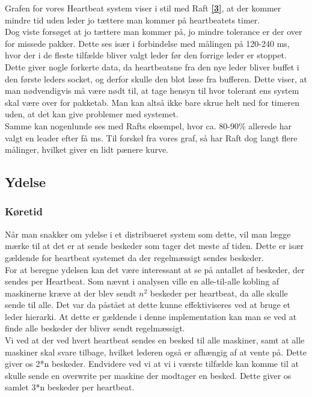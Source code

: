 \documentclass[a4paper,12pt]{article}
\begin{document}
Grafen for vores Heartbeat system viser i stil med Raft \hyperref[tre]{\textbf{[3]}}, at der kommer mindre tid uden leder jo tættere man kommer på heartbeatets timer.
\\
Dog viste forsøget at jo tættere man kommer på, jo mindre tolerance er der over for missede pakker. Dette ses især i forbindelse med målingen på 120-240 ms, hvor der i de fleste tilfælde bliver valgt leder før den forrige leder er stoppet. Dette giver nogle forkerte data, da heartbeatsne fra den nye leder bliver buffet i den første leders socket, og derfor skulle den blot læse fra bufferen. Dette viser, at man nødvendigvis må være nødt til, at tage hensyn til hvor tolerant ens system skal være over for pakketab. Man kan altså ikke bare skrue helt ned for timeren uden, at det kan give problemer med systemet. 
\\
Samme kan nogenlunde ses med Rafts eksempel, hvor ca. 80-90\% allerede har valgt en leader efter få ms. Til forskel fra vores graf, så har Raft dog langt flere målinger, hvilket giver en lidt pænere kurve.

\subsection{Ydelse}
\subsubsection{Køretid}
Når man snakker om ydelse i et distribueret system som dette, vil man lægge mærke til at det er at sende beskeder som tager det meste af tiden. Dette er især gældende for heartbeat systemet da der regelmæssigt sendes beskeder.
\\
For at beregne ydelsen kan det være interessant at se på antallet af beskeder, der sendes per Heartbeat.
Som nævnt i analysen ville en alle-til-alle kobling af maskinerne kræve at der blev sendt $n^2$ beskeder per heartbeat, da alle skulle sende til alle. 
Det var da påstået at dette kunne effektiviseres ved at bruge et leder hierarki.
At dette er gældende i denne implementation kan man se ved at finde alle beskeder der bliver sendt regelmæssigt.
\\
Vi ved at der ved hvert heartbeat sendes en besked til alle maskiner, samt at alle maskiner skal svare tilbage, hvilket lederen også er afhængig af at vente på. Dette giver os 2*n beskeder. Endvidere ved vi at vi i værste tilfælde kan komme til at skulle sende en overwrite per maskine der modtager en besked. Dette giver os samlet 3*n beskeder per heartbeat.
\newpage
\end{document}
